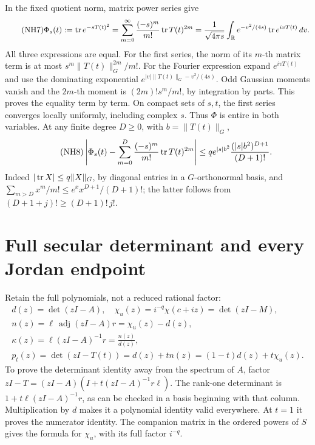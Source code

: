 \documentclass[11pt]{article}
\begin{document}
In the fixed quotient norm, matrix power series give
\begin{equation}\tag{NH7}\label{nhp:NH7}
\Phi_s(t):=\operatorname{tr} e^{-sT(t)^2}
=\sum_{m=0}^\infty\frac{(-s)^m}{m!}\operatorname{tr} T(t)^{2m}
=\frac1{\sqrt{4\pi s}}\int_\mathbb R
e^{-v^2/(4s)}\operatorname{tr} e^{ivT(t)}\,dv .
\end{equation}
All three expressions are equal. For the first series,
the norm of its \(m\)-th matrix term is at most
 \(s^m\|T(t)\|_G^{2m}/m!\).
For the Fourier expression expand \(e^{ivT(t)}\) and
use the dominating exponential
\(e^{|v|\|T(t)\|_G-v^2/(4s)}\).
Odd Gaussian moments vanish and the \(2m\)-th moment is
\((2m)!s^m/m!\), by integration by parts. This proves
the equality term by term. On compact sets of \(s,t\),
the first series converges locally uniformly, including
complex \(s\). Thus \(\Phi\) is entire in both variables.
At any finite degree \(D\ge0\), with \(b=\|T(t)\|_G\),
\begin{equation}\tag{NH8}\label{nhp:NH8}
\left|\Phi_s(t)-\sum_{m=0}^D
\frac{(-s)^m}{m!}\operatorname{tr} T(t)^{2m}\right|
\le q e^{|s|b^2}\frac{(|s|b^2)^{D+1}}{(D+1)!}.
\end{equation}
Indeed \(|\operatorname{tr} X|\le q\|X\|_G\), by diagonal entries in
a \(G\)-orthonormal basis, and
\(\sum_{m>D}x^m/m!\le e^x x^{D+1}/(D+1)!\);
the latter follows from
\((D+1+j)!\ge(D+1)!\,j!\).

\section{Full secular determinant and every Jordan endpoint}

Retain the full polynomials, not a reduced rational factor:
\begin{equation}\tag{NH9}\label{nhp:NH9}
\begin{gathered}
d(z)=\det(zI-A),\quad
\chi_u(z)=i^{-q}\chi(c+iz)=\det(zI-M),\\
n(z)=\ell\,\operatorname{adj}(zI-A)r=\chi_u(z)-d(z),\\
\kappa(z)=\ell(zI-A)^{-1}r=\frac{n(z)}{d(z)},\\
p_t(z)=\det(zI-T(t))=d(z)+tn(z)=(1-t)d(z)+t\chi_u(z).
\end{gathered}
\end{equation}
To prove the determinant identity away from the spectrum
of \(A\), factor \(zI-T=(zI-A)(I+t(zI-A)^{-1}r\ell)\).
The rank-one determinant is \(1+t\ell(zI-A)^{-1}r\),
as can be checked in a basis beginning with that column.
Multiplication by \(d\) makes it a polynomial identity
valid everywhere. At \(t=1\) it proves the numerator
identity. The companion matrix in the ordered powers of
\(S\) gives the formula for \(\chi_u\), with its full
factor \(i^{-q}\).
\end{document}
